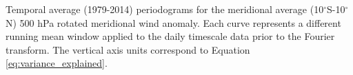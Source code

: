 \label{fig:periodogram}
Temporal average (1979-2014) periodograms for the meridional average (10$^{\circ}$S-10$^{\circ}$N) 500 hPa rotated meridional wind anomaly. Each curve represents a different running mean window applied to the daily timescale data prior to the Fourier transform. The vertical axis units correspond to Equation \ref{eq:variance_explained}.